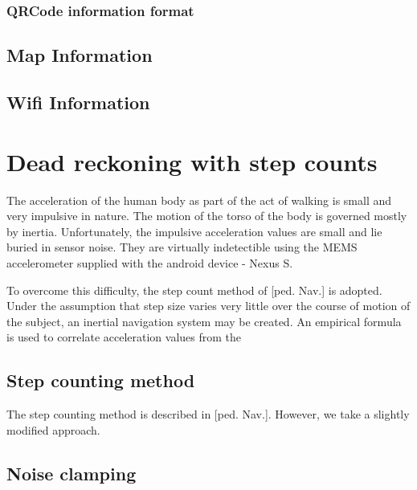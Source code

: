 \subsubsection{QRCode information format}



\subsection{Map Information}


\subsection{Wifi Information}



\section{Dead reckoning with step counts}

The acceleration of the human body as part of the act of walking is small and 
very impulsive in nature. The motion of the torso of the body is governed 
mostly by inertia. Unfortunately, the impulsive acceleration values are small 
and lie buried in sensor noise. They are virtually indetectible using the MEMS 
accelerometer supplied with the android device - Nexus S.

To overcome this difficulty, the step count method of [ped. Nav.] is adopted. 
Under the assumption that step size varies very little over the course of 
motion of the subject, an inertial navigation system may be created. An
empirical formula is used to correlate acceleration values from 
the 

\subsection{Step counting method}

The step counting method is described in [ped. Nav.]. However, we take a
slightly modified approach. 


\subsection{Noise clamping\label{sec:NoiseClamping}}

